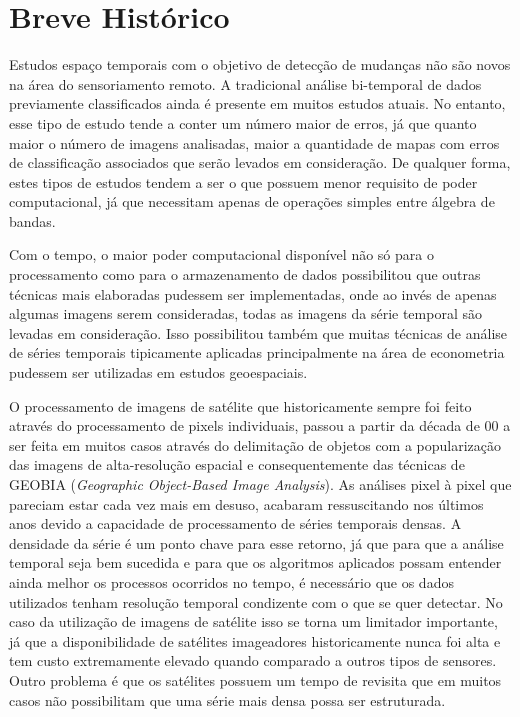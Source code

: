 \documentclass[twocolumn]{article}
\begin{document}
\section{Breve Histórico}

Estudos espaço temporais com o objetivo de detecção de mudanças não são novos na área do sensoriamento remoto. A tradicional análise bi-temporal de dados previamente classificados ainda é presente em muitos estudos atuais. No entanto, esse tipo de estudo tende a conter um número maior de erros, já que quanto maior o número de imagens analisadas, maior a quantidade de mapas com erros de classificação associados que serão levados em consideração. De qualquer forma, estes tipos de estudos tendem a ser o que possuem menor requisito de poder computacional, já que necessitam apenas de operações simples entre álgebra de bandas.
\par
Com o tempo, o maior poder computacional disponível não só para o processamento como para o armazenamento de dados possibilitou que outras técnicas mais elaboradas pudessem ser implementadas, onde ao invés de apenas algumas imagens serem consideradas, todas as imagens da série temporal são levadas em consideração. Isso possibilitou também que muitas técnicas de análise de séries temporais tipicamente aplicadas principalmente na área de econometria pudessem ser utilizadas em estudos geoespaciais.
\par
O processamento de imagens de satélite que historicamente sempre foi feito através do processamento de pixels individuais, passou a partir da década de 00 a ser feita em muitos casos através do delimitação de objetos com a popularização das imagens de alta-resolução espacial e consequentemente das técnicas de GEOBIA (\textit{Geographic Object-Based Image Analysis}). As análises pixel à pixel que pareciam estar cada vez mais em desuso, acabaram ressuscitando nos últimos anos devido a capacidade de processamento de séries temporais densas. A densidade da série é um ponto chave para esse retorno, já que para que a análise temporal seja bem sucedida e para que os algoritmos aplicados possam entender ainda melhor os processos ocorridos no tempo, é necessário que os dados utilizados tenham resolução temporal condizente com o que se quer detectar. No caso da utilização de imagens de satélite isso se torna um limitador importante, já que a disponibilidade de satélites imageadores historicamente nunca foi alta e tem custo extremamente elevado quando comparado a outros tipos de sensores. Outro problema é que os satélites possuem um tempo de revisita que em muitos casos não possibilitam que uma série mais densa possa ser estruturada. 
\end{document}
